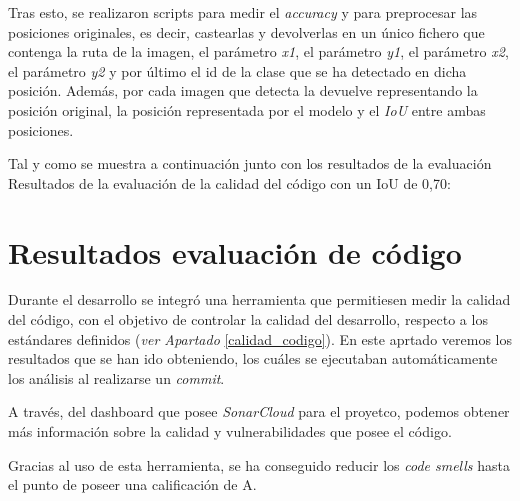 Tras esto, se realizaron scripts para medir el \textit{accuracy} y para preprocesar las posiciones originales, es decir, castearlas y devolverlas en un único fichero que contenga la ruta de la imagen, el parámetro \textit{x1}, el parámetro \textit{y1}, el parámetro \textit{x2}, el parámetro \textit{y2} y por último el id de la clase que se ha detectado en dicha posición.
Además, por cada imagen que detecta la devuelve representando la posición original, la posición representada por el modelo y el \textit{IoU} entre ambas posiciones.

\clearpage

Tal y como se muestra a continuación junto con los resultados de la evaluación
Resultados de la evaluación de la calidad del código con un IoU de 0,70:

\section{Resultados evaluación de código} 
Durante el desarrollo se integró una herramienta que permitiesen medir la calidad del código, con el objetivo de controlar la calidad del desarrollo, respecto a los estándares definidos (\textit{ver Apartado }\ref{calidad_codigo}).
En este aprtado veremos los resultados que se han ido obteniendo, los cuáles se ejecutaban automáticamente los análisis al realizarse un \textit{commit}.


\clearpage

A través, del dashboard que posee \textit{SonarCloud} para el proyetco, podemos obtener más información sobre la calidad y vulnerabilidades que posee el código.

 \label{dashboard}


Gracias al uso de esta herramienta, se ha conseguido reducir los \textit{code smells} hasta el punto de poseer una calificación de A.

